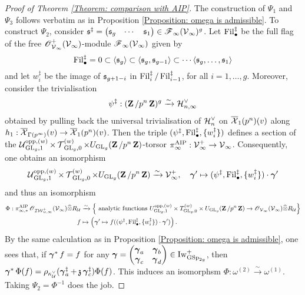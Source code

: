 \begin{proof}[Proof of Theorem \ref{Theorem: comparison with AIP}]
The construction of $\Psi_1$ and $\Psi_3$ follows verbatim as in Proposition \ref{Proposition: omega is admissible}. To construct $\Psi_2$, consider $\fraks^{\ddagger} = \begin{pmatrix}\fraks_g & \cdots & \fraks_1\end{pmatrix}\in \scrF_{\infty}(\calV_{\infty})^g$. Let $\Fil_{\bullet}^{\ddagger}$ be the full flag of the free $\scrO^+_{\calV_{\infty}}(\calV_{\infty})$-module $\scrF_{\infty}(\calV_{\infty})$ given by \[
    \Fil_{\bullet}^{\ddagger} = 0 \subset \langle \fraks_g \rangle \subset \langle \fraks_g, \fraks_{g-1} \rangle\subset \cdots \langle \fraks_g, \ldots, \fraks_1\rangle
\] and let $w_i^{\ddagger}$ be the image of $\fraks_{g+1-i}$ in $\Fil_{i}^{\ddagger}/\Fil_{i-1}^{\ddagger}$, for all $i=1, \ldots, g$. Moreover, consider the trivialisation \[
    \psi^{\ddagger}: (\Z/p^n\Z)^g \xrightarrow{\sim} \calH_{n,\infty}^{\vee}\] 
    obtained by pulling back the universal trivialisation of $\calH_n^{\vee}$ on $\overline{\calX}_1(p^n)(v)$ along $h_1:\overline{\calX}_{\Gamma(p^{\infty})}(v)\rightarrow \overline{\calX}_1(p^n)(v)$. Then the triple $(\psi^{\ddagger}, \Fil_{\bullet}^{\ddagger}, \{w_i^{\ddagger}\})$ defines a section of the $\calU_{\GL_g, 1}^{\opp, (w)}\times \calT_{\GL_g, 0}^{(w)}\times U_{\GL_g}(\Z/p^n\Z)$-torsor $\pi_{\infty}^{\AIP}: \calV^+_{\infty} \rightarrow \calV_{\infty}$. Consequently, one obtains an isomorphism \[
    \calU_{\GL_g, 1}^{\opp, (w)}\times \calT_{\GL_g, 0}^{(w)} \times U_{\GL_g}(\Z/p^n\Z) \xrightarrow{\sim} \calV^+_{\infty}, \quad \bfgamma' \mapsto (\psi^{\ddagger}, \Fil_{\bullet}^{\ddagger}, \{w_i^{\ddagger}\}) \cdot \bfgamma'
\] and thus an isomorphism \begin{align*}
    \Phi: \pi_{\infty, *}^{\AIP}\scrO_{\adicIW_{w, \infty}^+}(\calV_{\infty})\widehat{\otimes} R_{\calU} & \xrightarrow{\sim} \left\{
        \text{ analytic functions }
        U_{\GL_g, 1}^{\opp, (w)}\times T_{\GL_g, 0}^{(w)}\times U_{\GL_g}(\Z/p^n\Z) \rightarrow \scrO_{\calV_{\infty}}(\calV_{\infty})\widehat{\otimes}R_{\calU} 
\right\}\\
    f & \mapsto \left(\bfgamma'\mapsto f((\psi^{\ddagger}, \Fil_{\bullet}^{\ddagger}, \{w_i^{\ddagger}\}) \cdot \bfgamma')\right).
\end{align*} 
By the same calculation as in Proposition \ref{Proposition: omega is admissible}, one sees that, if $\bfgamma^* f = f$ for any $\bfgamma = \begin{pmatrix}\bfgamma_a & \bfgamma_b \\ \bfgamma_c & \bfgamma_d\end{pmatrix}\in \Iw_{\GSp_{2g}}^+$, then $\bfgamma^*\Phi(f) = \rho_{\kappa_{\calU}^{\vee}}(\bfgamma_a^{\ddagger} + \frakz\bfgamma_c^{\ddagger})\Phi(f)$. This induces an isomorphsm
$\Phi: \omega^{(2)}\xrightarrow[]{\sim}\omega^{(1)}$. Taking $\Psi_2=\Phi^{-1}$ does the job.
\end{proof}

